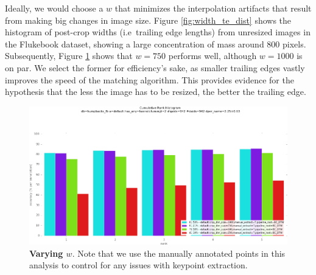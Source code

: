 


Ideally, we would choose a $w$ that minimizes the interpolation artifacts that result from making big changes in image size.
Figure \ref{fig:width_te_dist} shows the histogram of post-crop widths (i.e\ trailing edge lengths) from unresized images in the Flukebook dataset, showing a large concentration of mass around 800 pixels. 
Subsequently, Figure \ref{fig:vary_crop_size} shows that $w = 750$ performs well, although $w = 1000$ is on par.
We select the former for efficiency's sake, as smaller trailing edges vastly improves the speed of the matching algorithm.
This provides evidence for the hypothesis that the less the image has to be resized, the better the trailing edge.



\begin{figure}[t]%
\centering
\includegraphics[width=1\textwidth]{../images/results/vary_crop_size.png}
\caption{\textbf{Varying $w$}. Note that we use the manually annotated points in this analysis to control for any issues with keypoint extraction.}
\label{fig:vary_crop_size}
\end{figure}


